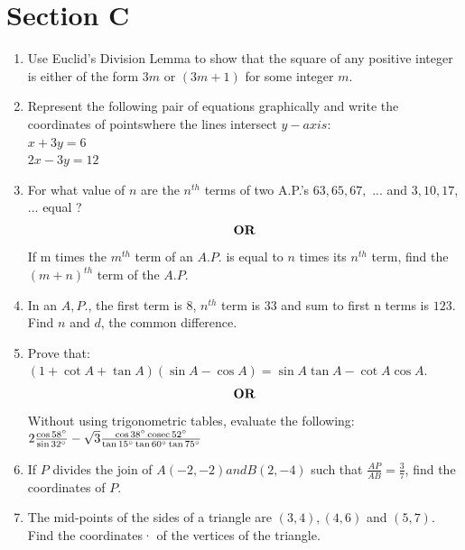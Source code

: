 \documentclass[journal,12pt,twocolumn]{IEEEtran}
\renewcommand\thesection{\arabic{section}}
\begin{document}
\section{Section C}
\renewcommand{\theequation}{\theenumi}
\begin{enumerate}[label=\thesection.\arabic*.,ref=\thesection.\theenumi]
\item Use Euclid's Division Lemma to show that the square of any positive integer is either of the form $3m$ or $(3m + 1)$ for some integer $m$.\\ 
\item Represent the following pair of equations graphically and write the coordinates of pointswhere the lines intersect $y-axis:$\\
$x+3y=6$ \\
$2x-3y=12$ \\
\item For what value of $n$ are the $n^{th}$ terms of two A.P.'s $63, 65, 67,$ ... and $3, 10, 17$, ... equal ?\\
	\begin{align}
		\centering \vec{OR}\nonumber
	\end{align}
If m times the $m^{th}$ term of an $A.P$. is equal to $n$ times its $n^{th}$ term, find the $(m+n)^{th}$ term of the $A.P$.
\item In an $A,P$., the first term is $8$, $n^{th}$ term is $33$ and sum to first n terms is $123$. Find $n$ and $d$, the common difference.\\
\item Prove that: \\ $(1 + \cot A+ \tan A) (\sin A - \cos A) = \sin A \tan A - \cot A \cos A$.\\
	\begin{align}
		\centering \vec{OR}\nonumber
	\end{align}
Without using trigonometric tables, evaluate the following:\\
$2\frac{\cos58\degree}{\sin32\degree}-\sqrt{3}\frac{\cos38\degree \,\text{cosec}\,52\degree}{\tan15\degree \tan60\degree \tan75\degree}$\\
\item If $P$ divides the join of $A(-2, -2) and B(2, -4)$ such that $\frac{AP}{AB}=\frac{3}{7}$, find the coordinates of $P$.\\
\item The mid-points of the sides of a triangle are $(3, 4), (4, 6)$ and $(5, 7)$. Find the coordinates· of the vertices of the triangle.\\

\end{enumerate}
\end{document}
